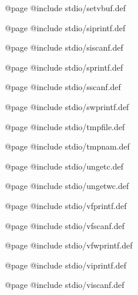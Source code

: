 @page
@include stdio/setvbuf.def

@page
@include stdio/siprintf.def

@page
@include stdio/siscanf.def

@page
@include stdio/sprintf.def

@page
@include stdio/sscanf.def

@page
@include stdio/swprintf.def

@page
@include stdio/tmpfile.def

@page
@include stdio/tmpnam.def

@page
@include stdio/ungetc.def

@page
@include stdio/ungetwc.def

@page
@include stdio/vfprintf.def

@page
@include stdio/vfscanf.def

@page
@include stdio/vfwprintf.def

@page
@include stdio/viprintf.def

@page
@include stdio/viscanf.def

